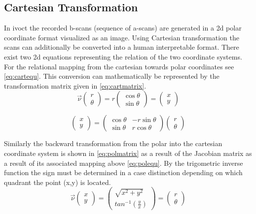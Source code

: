 \subsection{Cartesian Transformation}

In \acrshort{ivoct} the recorded \Glspl{b-scan} (sequence of \Glspl{a-scan}) are generated in a \acrshort{2d} polar coordinate format visualized as an image. Using Cartesian transformation the scans can additionally be converted into a human interpretable format. There exist two \acrshort{2d} equations representing the relation of the two coordinate systems. For the relational mapping from the cartesian towards polar coordinates see \cref{eq:cartequ}. This conversion can mathematically be represented by the transformation matrix given in \cref{eq:cartmatrix}.
\begin{equation}
\vec{\nu} \begin{pmatrix} r \\ \theta \end{pmatrix} = 
r \begin{pmatrix} \cos \theta \\ \sin \theta \end{pmatrix} = 
\begin{pmatrix} x \\ y \end{pmatrix}
\label{eq:cartequ}
\end{equation}

\begin{equation}
\begin{pmatrix}
x \\
y \end{pmatrix} = \begin{pmatrix}
\cos \theta & -r \sin \theta \\
\sin \theta & r \cos \theta \end{pmatrix} \begin{pmatrix}
r \\ \theta \end{pmatrix}
\label{eq:cartmatrix}
\end{equation}

Similarly the backward transformation from the polar into the cartesian coordinate system is shown in \cref{eq:polmatrix} as a result of the Jacobian matrix as a result of its associated mapping above \cref{eq:polequ}. By the trigometric inverse function the sign must be determined in a case distinction depending on which quadrant the point (x,y) is located.
\begin{equation}
\vec{\nu} \begin{pmatrix} x \\ y \end{pmatrix} =
\begin{pmatrix} \sqrt{ x^2 + y^2 } \\ tan^{-1}\left( \frac{y}{x} \right) \end{pmatrix} = \begin{pmatrix} r \\ \theta \end{pmatrix}
\label{eq:polequ}
\end{equation}

